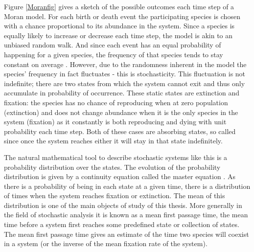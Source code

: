 Figure \ref{Moranfig} gives a sketch of the possible outcomes each time step of a Moran model. 
For each birth or death event the participating species is chosen with a chance proportional to its abundance in the system. 
Since a species is equally likely to increase or decrease each time step, the model is akin to an unbiased random walk. %
And since each event has an equal probability of happening for a given species, the frequency of that species tends to stay constant on average \cite{Kimura1955,Moran1962}. 
However, due to the randomness inherent in the model the species' frequency in fact fluctuates - this is stochasticity. 
This fluctuation is not indefinite; there are two states from which the system cannot exit and thus only accumulate in probability of occurrence. 
These static states are extinction and fixation: the species has no chance of reproducing when at zero population (extinction) and does not change abundance when it is the only species in the system (fixation) as it constantly is both reproducing and dying with unit probability each time step. 
Both of these cases are absorbing states, so called since once the system reaches either it will stay in that state indefinitely. 

The natural mathematical tool to describe stochastic systems like this is a probability distribution over the states. 
The evolution of the probability distribution is given by a continuity equation called the master equation \cite{Nisbet1982,Gardiner2004a,Iyer-Biswas2015}. 
As there is a probability of being in each state at a given time, there is a distribution of times when the system reaches fixation or extinction. 
The mean of this distribution is one of the main objects of study of this thesis. 
More generally in the field of stochastic analysis it is known as a mean first passage time, the mean time before a system first reaches some predefined state or collection of states. 
The mean first passage time gives an estimate of the time two species will coexist in a system (or the inverse of the mean fixation rate of the system). 

